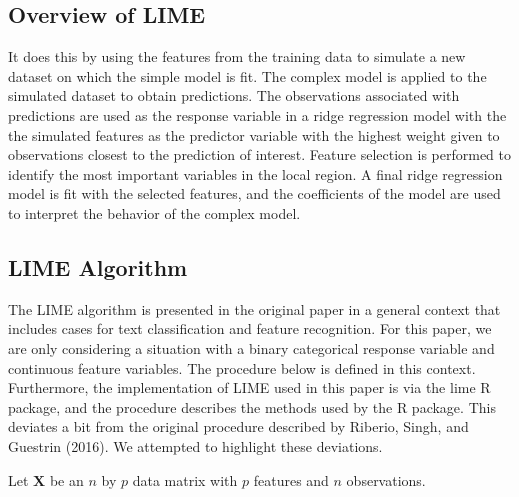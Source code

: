 \documentclass[AMS,STIX2COL]{WileyNJD-v2}\usepackage[]{graphicx}\usepackage[]{color}
\begin{document}
\subsection{Overview of LIME}

It does this by using the features from the training data to simulate a new dataset on which the simple model is fit. The complex model is applied to the simulated dataset to obtain predictions. The observations associated with predictions are used as the response variable in a ridge regression model with the the simulated features as the predictor variable with the highest weight given to observations closest to the prediction of interest. Feature selection is performed to identify the most important variables in the local region. A final ridge regression model is fit with the selected features, and the coefficients of the model are used to interpret the behavior of the complex model.

\subsection{LIME Algorithm}

The LIME algorithm is presented in the original paper in a general context that includes cases for text classification and feature recognition. For this paper, we are only considering a situation with a binary categorical response variable and continuous feature variables. The procedure below is defined in this context. Furthermore, the implementation of LIME used in this paper is via the lime R package, and the procedure describes the methods used by the R package. This deviates a bit from the original procedure described by Riberio, Singh, and Guestrin (2016). We attempted to highlight these deviations.

Let $\textbf{X}$ be an $n$ by $p$ data matrix with $p$ features and $n$ observations.
\end{document}
